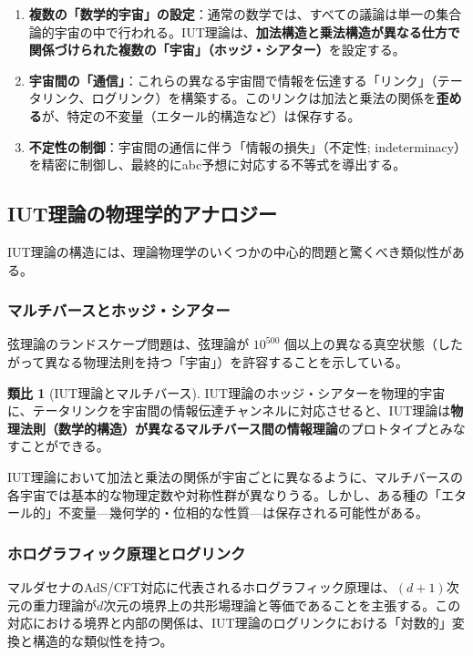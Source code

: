 \documentclass[12pt,a4paper]{ltjsarticle}
\theoremstyle{definition}
\newtheorem{analogy}[definition]{類比}
\begin{document}
\begin{enumerate}[leftmargin=2em]
  \item \textbf{複数の「数学的宇宙」の設定}：通常の数学では、すべての議論は単一の集合論的宇宙の中で行われる。IUT理論は、\textbf{加法構造と乗法構造が異なる仕方で関係づけられた複数の「宇宙」（ホッジ・シアター）}を設定する。
  \item \textbf{宇宙間の「通信」}：これらの異なる宇宙間で情報を伝達する「リンク」（テータリンク、ログリンク）を構築する。このリンクは加法と乗法の関係を\textbf{歪める}が、特定の不変量（エタール的構造など）は保存する。
  \item \textbf{不定性の制御}：宇宙間の通信に伴う「情報の損失」（不定性; indeterminacy）を精密に制御し、最終的にabc予想に対応する不等式を導出する。
\end{enumerate}

\subsection{IUT理論の物理学的アナロジー}

IUT理論の構造には、理論物理学のいくつかの中心的問題と驚くべき類似性がある。

\subsubsection{マルチバースとホッジ・シアター}

弦理論のランドスケープ問題\cite{Susskind2003, Bousso2000}は、弦理論が $10^{500}$ 個以上の異なる真空状態（したがって異なる物理法則を持つ「宇宙」）を許容することを示している。

\begin{analogy}[IUT理論とマルチバース]
IUT理論のホッジ・シアターを物理的宇宙に、テータリンクを宇宙間の情報伝達チャンネルに対応させると、IUT理論は\textbf{物理法則（数学的構造）が異なるマルチバース間の情報理論}のプロトタイプとみなすことができる。

IUT理論において加法と乗法の関係が宇宙ごとに異なるように、マルチバースの各宇宙では基本的な物理定数や対称性群が異なりうる。しかし、ある種の「エタール的」不変量---幾何学的・位相的な性質---は保存される可能性がある。
\end{analogy}

\subsubsection{ホログラフィック原理とログリンク}

マルダセナのAdS/CFT対応\cite{Maldacena1998}に代表されるホログラフィック原理は、$(d+1)$次元の重力理論が$d$次元の境界上の共形場理論と等価であることを主張する。この対応における境界と内部の関係は、IUT理論のログリンクにおける「対数的」変換と構造的な類似性を持つ。
\end{document}
